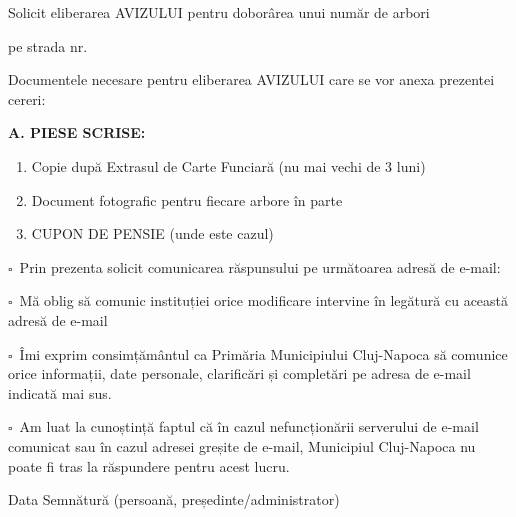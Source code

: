 \documentclass[11pt,a4paper]{article}
\newcommand{\fillline}[1][6cm]{\underline{\hspace{#1}}}
\newcommand{\checkboxempty}{$\square$}
\begin{document}
\hspace{1cm}Solicit eliberarea AVIZULUI pentru doborârea unui număr de \fillline[1.5cm] arbori

pe strada \fillline[8cm] nr. \fillline[5cm]

\vspace{0.5cm}

Documentele necesare pentru eliberarea AVIZULUI care se vor anexa prezentei cereri:

\vspace{0.3cm}

\textbf{A. PIESE SCRISE:}

\vspace{0.3cm}

\begin{enumerate}[leftmargin=2cm]
\item Copie după Extrasul de Carte Funciară (nu mai vechi de 3 luni)
\item Document fotografic pentru fiecare arbore în parte
\item CUPON DE PENSIE (unde este cazul)
\end{enumerate}

\vspace{0.5cm}

\checkboxempty\ Prin prezenta solicit comunicarea răspunsului pe următoarea adresă de e-mail:

\vspace{0.2cm}

\fillline[14cm]

\vspace{0.4cm}

\checkboxempty\ Mă oblig să comunic instituției orice modificare intervine în legătură cu această adresă de e-mail

\checkboxempty\ Îmi exprim consimțământul ca Primăria Municipiului Cluj-Napoca să comunice orice informații, date personale, clarificări și completări pe adresa de e-mail indicată mai sus.

\checkboxempty\ Am luat la cunoștință faptul că în cazul nefuncționării serverului de e-mail comunicat sau în cazul adresei greșite de e-mail, Municipiul Cluj-Napoca nu poate fi tras la răspundere pentru acest lucru.

\vspace{0.8cm}

\hspace{1cm}Data \hfill Semnătură \dotfill (persoană, președinte/administrator)\hspace{1cm}
\end{document}
